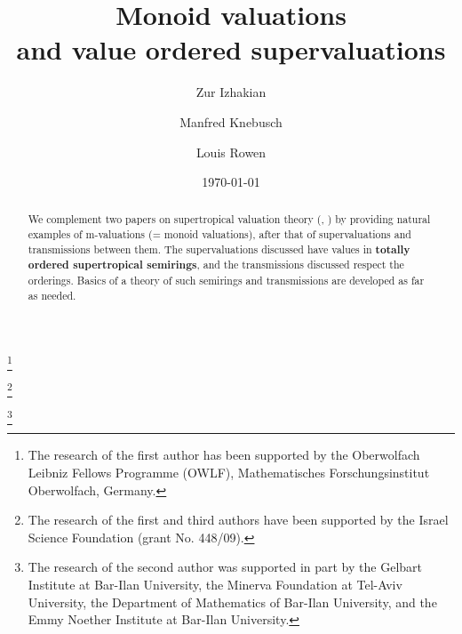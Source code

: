 \documentclass [12pt,a4paper,reqno]{amsart}
\begin{document}
\title[Monoid valuations and value ordered supervaluations ]
{Monoid valuations \\ \vskip 2mm and value ordered supervaluations
}
\author[Z. Izhakian]{Zur Izhakian}
\address{Department of Mathematics, Bar-Ilan University, Ramat-Gan 52900,
Israel}
\author[M. Knebusch]{Manfred Knebusch}
\address{Department of Mathematics,
NWF-I Mathematik, Universit\"at Regensburg 93040 Regensburg,
Germany} 
\author[L. Rowen]{Louis Rowen}
 \address{Department of Mathematics,
 Bar-Ilan University,  Ramat-Gan 52900, Israel}

\thanks{The research of the first author has been supported  by the
Oberwolfach Leibniz Fellows Programme (OWLF), Mathematisches
Forschungsinstitut Oberwolfach, Germany.}

\thanks{The research of the first and third authors have  been  supported  by the
Israel Science Foundation (grant No.  448/09).}

\thanks{The research of the second author was supported in part by
 the Gelbart Institute at
Bar-Ilan University, the Minerva Foundation at Tel-Aviv
University, the Department of Mathematics   of Bar-Ilan
University, and the Emmy Noether Institute at Bar-Ilan
University.}


\date{\today}


\begin{abstract}
We complement two papers on supertropical valuation theory
(\cite{IKR1}, \cite{IKR2}) by providing natural examples of
{m}-valuations (= monoid valuations), after that of supervaluations
and transmissions between them. The supervaluations discussed have
values in \textbf{totally ordered supertropical semirings}, and
the transmissions discussed respect the orderings. Basics of a
theory of such semirings and transmissions are developed as far as
needed.
\end{abstract}

\maketitle
\end{document}
